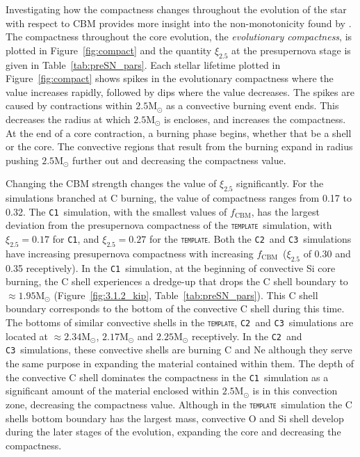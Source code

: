 \documentclass[useAMS,usenatbib]{mn2e}
\newcommand{\Msun}{\ensuremath{\mathrm{M}_\odot}}
\newcommand{\fcbm}{\ensuremath{f_\mathrm{CBM}}}
\newcommand{\template}{\textsc{\texttt{template}}}
\newcommand{\Ca}{\textsc{\texttt{C1}}}
\newcommand{\Cb}{\textsc{\texttt{C2}}}
\newcommand{\Cc}{\textsc{\texttt{C3}}}
\begin{document}
Investigating how the compactness changes throughout the evolution of the star
with respect to CBM provides more insight into the non-monotonicity found by
\citet{Sukhbold2014}. The compactness throughout the core evolution, the 
\textit{evolutionary compactness}, is plotted in Figure~\ref{fig:compact} and 
the quantity $\xi_{2.5}$ at the presupernova stage is given in 
Table~\ref{tab:preSN_pars}. Each stellar lifetime plotted in 
Figure~\ref{fig:compact} shows spikes in the evolutionary compactness where 
the value increases rapidly, followed by dips where the value decreases. The 
spikes are caused by contractions within $2.5\Msun$ as a convective burning 
event ends. This decreases the radius at which $2.5\Msun$ is encloses, and 
increases the compactness. At the end of a core contraction, a burning phase 
begins, whether that be a shell or the core. The convective regions that result 
from the burning expand in radius pushing $2.5\Msun$ further out and 
decreasing the compactness value. 

Changing the CBM strength changes the value of $\xi_{2.5}$ significantly. For 
the simulations branched at C burning, the value of compactness ranges from 
0.17 to 0.32. The \Ca\ simulation, with the smallest values of \fcbm, has the 
largest deviation from the presupernova compactness of the \template\ 
simulation, with $\xi_{2.5}=0.17$ for \Ca, and $\xi_{2.5}=0.27$ for the \template. 
Both the \Cb\ and \Cc\ simulations have increasing presupernova compactness 
with increasing \fcbm\ ($\xi_{2.5}$ of 0.30 and 0.35 receptively). In the \Ca\ 
simulation, at the beginning of convective Si core burning, the C shell experiences 
a dredge-up that drops the C shell boundary to $\approx 1.95\Msun$ 
(Figure~\ref{fig:3.1.2_kip}, Table~\ref{tab:preSN_pars}). This C shell boundary 
corresponds to the bottom of the convective C shell during this time. The 
bottoms of similar convective shells in the \template, \Cb\ and \Cc\ simulations 
are located at $\approx 2.34\Msun$, $2.17\Msun$ and $2.25\Msun$ receptively. 
In the \Cb\ and \Cc\ simulations, these convective shells are burning C and Ne 
although they serve the same purpose in expanding the material contained 
within them. The depth of the convective C shell dominates the compactness 
in the \Ca\ simulation as a significant amount of the material enclosed within 
$2.5\Msun$ is in this convection zone, decreasing the compactness value. 
Although in the \template\ simulation the C shells bottom boundary has the 
largest mass, convective O and Si shell develop during the later stages of the 
evolution, expanding the core and decreasing the compactness. 
\end{document}
